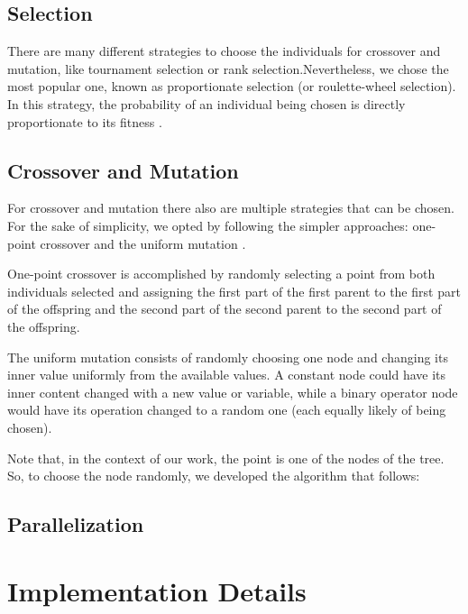 \documentclass[runningheads]{llncs}
\begin{document}
\subsection{Selection}

There are many different strategies to choose the individuals for crossover and mutation, like tournament selection or rank selection.Nevertheless, we chose the most popular one, known as proportionate selection (or roulette-wheel selection). In this strategy, the probability of an individual being chosen is directly proportionate to its fitness \cite{martins2016gacuda}.

\subsection{Crossover and Mutation}

For crossover and mutation there also are multiple strategies that can be chosen. For the sake of simplicity, we opted by following the simpler approaches: one-point crossover and the uniform mutation \cite{martins2016gacuda}.

One-point crossover is accomplished by randomly selecting a point from both individuals selected and assigning the first part of the first parent to the first part of the offspring and the second part of the second parent to the second part of the offspring.

The uniform mutation consists of randomly choosing one node and changing its inner value uniformly from the available values. A constant node could have its inner content changed with a new value or variable, while a binary operator node would have its operation changed to a random one (each equally likely of being chosen).

Note that, in the context of our work, the point is one of the nodes of the tree. So, to choose the node randomly, we developed the algorithm that follows:

\subsection{Parallelization}

\section{Implementation Details}
\end{document}
